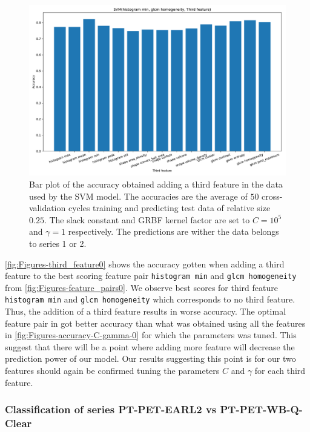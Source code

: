 \begin{figure}[H]
\centering
\includegraphics[width=1\textwidth]{Figures/third_feature0}
\caption{Bar plot of the accuracy obtained adding a third feature in the data used 
by the SVM model. The accuracies are the average 
of $50$ cross-validation cycles training and predicting test data of relative size $0.25$.
The slack constant and GRBF kernel factor are set to $C=10^5$ and $\gamma=1 $ respectively.
 The predictions are wither the data belongs to series 1 or 2.}
\label{fig:Figures-third_feature0}
\end{figure}

\autoref{fig:Figures-third_feature0} shows the accuracy gotten when adding a third feature to the best scoring feature pair 
\verb|histogram min| and \verb|glcm homogeneity| from \autoref{fig:Figures-feature_pairs0}. We observe best scores for 
third feature \verb|histogram min| and \verb|glcm homogeneity| which corresponds to no third feature. Thus, the addition of 
a third feature results in worse accuracy. The optimal feature pair in got better accuracy than 
what was obtained using all the features in \autoref{fig:Figures-accuracy-C-gamma-0} for which the parameters was tuned.
This suggest that there will be a point where adding more feature will decrease the prediction power of our model. 
Our results suggesting this point is for our two features should again be confirmed tuning the parameters $C$ and $\gamma $ 
for each third feature.  

\subsubsection{Classification of series PT-PET-EARL2 vs PT-PET-WB-Q-Clear}
\label{sec:SVM1}

